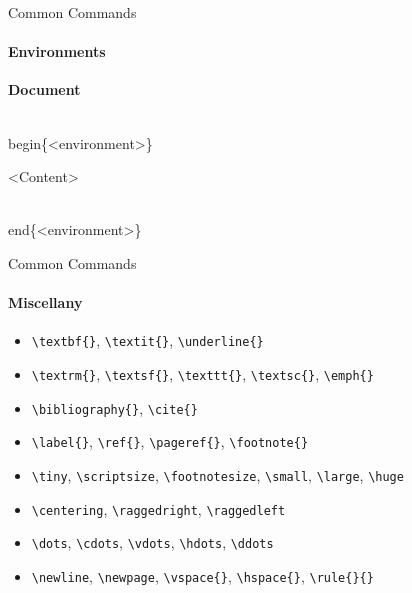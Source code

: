 \documentclass{beamer}
\begin{document}
\begin{frame}{Common Commands}
\framesubtitle{Environments}
	\textbf{Document}
	\begin{semiverbatim}
		\\begin\{<environment>\}
		
		 <Content>
			
		\\end\{<environment>\}
	\end{semiverbatim}
\end{frame}

\begin{frame}{Common Commands}
\framesubtitle{Miscellany}
	\begin{itemize}
		\item<1-> \texttt{\textbackslash textbf\{\}}, \texttt{\textbackslash textit\{\}}, \texttt{\textbackslash underline\{\}}
		\item<2-> \texttt{\textbackslash textrm\{\}}, \texttt{\textbackslash textsf\{\}}, \texttt{\textbackslash texttt\{\}}, \texttt{\textbackslash textsc\{\}}, \texttt{\textbackslash emph\{\}}
		\item<3-> \texttt{\textbackslash bibliography\{\}}, \texttt{\textbackslash cite\{\}}
		\item<4-> \texttt{\textbackslash label\{\}}, \texttt{\textbackslash ref\{\}}, \texttt{\textbackslash pageref\{\}}, \texttt{\textbackslash footnote\{\}}
		\item<5-> \texttt{\textbackslash tiny}, \texttt{\textbackslash scriptsize}, \texttt{\textbackslash footnotesize}, \texttt{\textbackslash small}, \texttt{\textbackslash large}, \texttt{\textbackslash huge}
		\item<6-> \texttt{\textbackslash centering}, \texttt{\textbackslash raggedright}, \texttt{\textbackslash raggedleft}
		\item<7-> \texttt{\textbackslash dots}, \texttt{\textbackslash cdots}, \texttt{\textbackslash vdots}, \texttt{\textbackslash hdots}, \texttt{\textbackslash ddots}
		\item<8-> \texttt{\textbackslash newline}, \texttt{\textbackslash newpage}, \texttt{\textbackslash vspace\{\}}, \texttt{\textbackslash hspace\{\}}, \texttt{\textbackslash rule\{\}\{\}}
	\end{itemize}
\end{frame}
\end{document}
